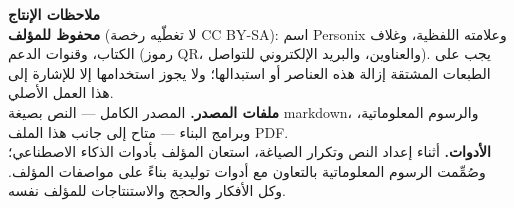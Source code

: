 \clearpage
\thispagestyle{empty}
\begin{flushleft}\small\sffamily
\textbf{ملاحظات الإنتاج}\\[1.2em]

\textbf{محفوظ للمؤلف} (لا تغطّيه رخصة CC BY-SA): اسم Personix وعلامته
اللفظية، وغلاف الكتاب، وقنوات الدعم (رموز QR، والعناوين، والبريد الإلكتروني
للتواصل). يجب على الطبعات المشتقة إزالة هذه العناصر أو استبدالها؛ ولا يجوز
استخدامها إلا للإشارة إلى هذا العمل الأصلي.\\[1.2em]

\textbf{ملفات المصدر.} المصدر الكامل --- النص بصيغة markdown، والرسوم المعلوماتية،
وبرامج البناء --- متاح إلى جانب هذا الملف PDF.\\[1.2em]

\textbf{الأدوات.} أثناء إعداد النص وتكرار الصياغة، استعان
المؤلف بأدوات الذكاء الاصطناعي؛ وصُمِّمت الرسوم المعلوماتية
بالتعاون مع أدوات توليدية بناءً على مواصفات المؤلف.
وكل الأفكار والحجج والاستنتاجات للمؤلف نفسه.
\end{flushleft}
\clearpage
